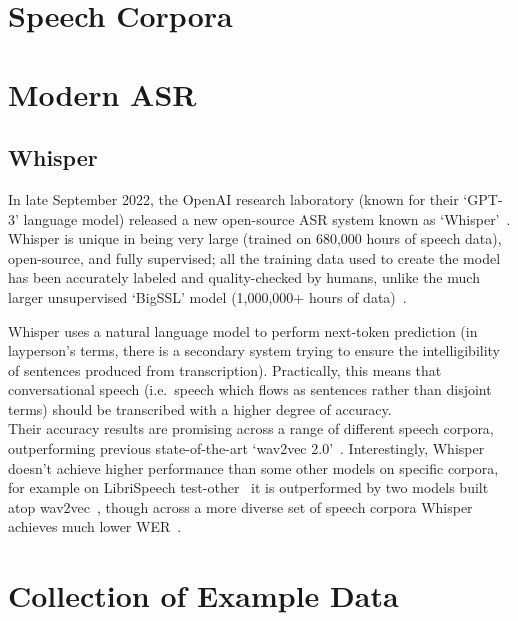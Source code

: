 \section{Speech Corpora}\label{sec:} 

\section{Modern ASR}\label{sec:modern-asr}


\subsection{Whisper}\label{subsec:whisper}

In late September 2022, the OpenAI research laboratory (known for their `GPT-3' language model) released a new open-source ASR system known as `Whisper'~\cite{whisper}.
Whisper is unique in being very large (trained on 680,000 hours of speech data), open-source, and fully supervised;
all the training data used to create the model has been accurately labeled and
quality-checked by humans, unlike the much larger unsupervised `BigSSL' model (1,000,000+ hours of data)~\cite{bigssl}.

Whisper uses a natural language model to perform next-token prediction (in layperson's
terms, there is a secondary system trying to ensure the intelligibility of sentences produced from transcription).
Practically, this means that conversational speech (i.e.\ speech which flows as sentences rather than disjoint terms) should be transcribed with a higher degree of accuracy.\\

Their accuracy results are promising across a range of different speech corpora, outperforming previous state-of-the-art `wav2vec 2.0'~\cite{wav2vec}.
Interestingly, Whisper doesn't achieve higher performance than some other models on specific corpora, for example on LibriSpeech test-other~\cite{librispeech} it is outperformed by two models built atop wav2vec~\cite{zhang2020,chung2021}, though across a more diverse set of speech corpora Whisper achieves much lower WER~\cite{whisper}.

\section{Collection of Example Data}\label{sec:}
